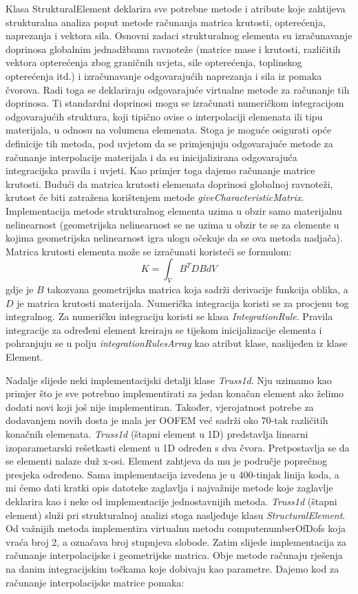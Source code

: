 \documentclass[a4paper,twoside,12pt]{memoir} %
\begin{document}
Klasa StrukturalElement deklarira sve potrebne metode i atribute koje zahtijeva strukturalna analiza poput metode računanja matrica krutosti, opterećenja, naprezanja i vektora sila. 
Osnovni zadaci strukturalnog elementa su izračunavanje doprinosa globalnim jednadžbama ravnoteže (matrice mase i krutosti, različitih vektora opterećenja zbog graničnih uvjeta, sile opterećenja, toplinskog opterećenja itd.) i izračunavanje odgovarajućih naprezanja i sila iz pomaka čvorova. Radi toga se deklariraju odgovarajuće virtualne metode za računanje tih doprinosa. Ti standardni doprinosi mogu se izračunati numeričkom integracijom odgovarajućih struktura, koji tipično ovise o interpolaciji elemenata ili tipu materijala, u odnosu na volumena elemenata. Stoga je moguće osigurati opće definicije tih metoda, pod uvjetom da se primjenjuju odgovarajuće metode za računanje interpolacije materijala i da su inicijalizirana odgovarajuća integracijska pravila i uvjeti. Kao primjer toga dajemo računanje matrice krutosti. Budući da matrica krutosti elemenata doprinosi globalnoj ravnoteži, krutost će biti zatražena korištenjem metode \textit{giveCharacteristicMatrix}. Implementacija metode strukturalnog elementa uzima u obzir samo materijalnu nelinearnost (geometrijska nelinearnost se ne uzima u obzir te se za elemente u kojima geometrijska nelinearnost igra ulogu očekuje da se ova metoda nadjača). Matrica krutosti elementa može se izračunati koristeći se formulom:
$$ K = \int_V B^T D B dV $$
gdje je $B$ takozvana geometrijska matrica koja sadrži derivacije funkcija oblika, a $D$ je matrica krutosti materijala. Numerička integracija koristi se za procjenu tog integralnog. Za numeričku integraciju koristi se klasa \textit{IntegrationRule}. Pravila integracije za određeni element kreiraju se tijekom inicijalizacije elementa i pohranjuju se u polju \textit{integrationRulesArray} kao atribut klase, naslijeđen iz klase Element. \par

Nadalje slijede neki implementacijski detalji klase \textit{Truss1d}. Nju uzimamo kao primjer što je sve potrebno implementirati za jedan konačan element ako želimo dodati novi koji još nije implementiran. Također, vjerojatnost potrebe za dodavanjem novih dosta je mala jer OOFEM već sadrži oko 70-tak različitih konačnih elemenata. \textit{Truss1d} (štapni element u 1D) predstavlja linearni izoparametarski rešetkasti element u 1D određen s dva čvora. Pretpostavlja se da se elementi nalaze duž x-osi. Element zahtjeva da mu je područje poprečnog presjeka određeno. Sama implementacija izvedena je u 400-tinjak linija koda, a mi ćemo dati kratki opis datoteke zaglavlja i najvažnije metode koje zaglavlje deklarira kao i neke od implementacije jednostavnijih metoda. \textit{Truss1d} (štapni element) služi pri strukturalnoj analizi stoga nasljeđuje klasu \textit{StructuralElement}. Od važnijih metoda implementira virtualnu metodu computenumberOfDofs koja vraća broj 2, a označava broj stupnjeva slobode. Zatim slijede implementacija za računanje interpolacijske i geometrijske matrica. Obje metode računaju rješenja na danim integracijskim točkama koje dobivaju kao parametre. Dajemo kod za računanje interpolacijske matrice pomaka:
\end{document}
